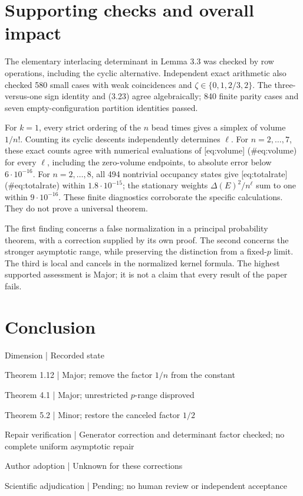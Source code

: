 \documentclass[10pt]{article}
\begin{document}
\section*{Supporting checks and overall impact}
The elementary interlacing determinant in Lemma 3.3 was checked by row operations, including the cyclic alternative. Independent exact arithmetic also checked 580 small cases with weak coincidences and \(\zeta\in\{0,1,2/3,2\}\). The three-versus-one sign identity and (3.23) agree algebraically; 840 finite parity cases and seven empty-configuration partition identities passed.\par
For \(k=1\), every strict ordering of the \(n\) bead times gives a simplex of volume \(1/n!\). Counting its cyclic descents independently determines \(\ell\). For \(n=2,\ldots,7\), these exact counts agree with numerical evaluations of [eq:volume] (\#eq:volume) for every \(\ell\), including the zero-volume endpoints, to absolute error below \(6\cdot10^{-16}\). For \(n=2,\ldots,8\), all 494 nontrivial occupancy states give [eq:totalrate] (\#eq:totalrate) within \(1.8\cdot10^{-15}\); the stationary weights \(\Delta(E)^2/n^\ell\) sum to one within \(9\cdot10^{-16}\). These finite diagnostics corroborate the specific calculations. They do not prove a universal theorem.\par
The first finding concerns a false normalization in a principal probability theorem, with a correction supplied by its own proof. The second concerns the stronger asymptotic range, while preserving the distinction from a fixed-\(p\) limit. The third is local and cancels in the normalized kernel formula. The highest supported assessment is Major; it is not a claim that every result of the paper fails.\par
\section*{Conclusion}
Dimension | Recorded state\par
Theorem 1.12 | Major; remove the factor \(1/n\) from the constant\par
Theorem 4.1 | Major; unrestricted \(p\)-range disproved\par
Theorem 5.2 | Minor; restore the canceled factor \(1/2\)\par
Repair verification | Generator correction and determinant factor checked; no complete uniform asymptotic repair\par
Author adoption | Unknown for these corrections\par
Scientific adjudication | Pending; no human review or independent acceptance\par
\end{document}
